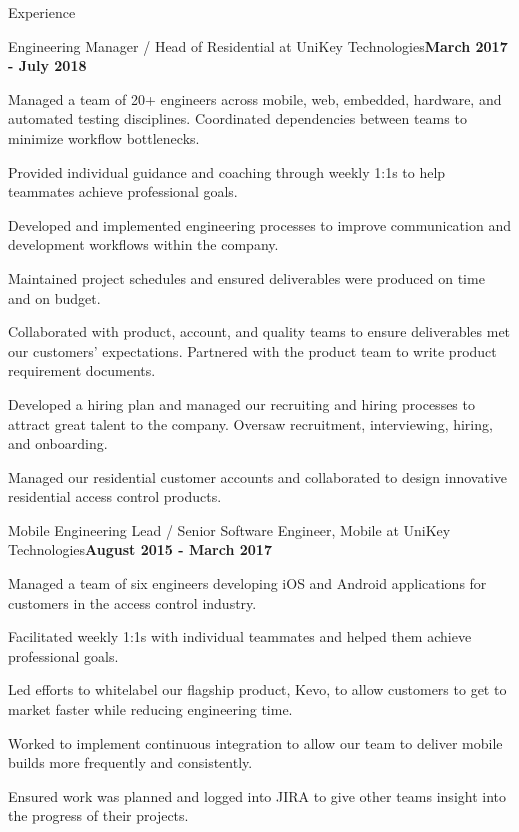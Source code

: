 \documentclass{resume} %
\begin{document}
\begin{rSection}{Experience}
\begin{rSubsection}{Engineering Manager / Head of Residential at UniKey Technologies}{\bf March 2017 - July 2018}{}{}
    \item Managed a team of 20+ engineers across mobile, web, embedded, hardware, and automated testing disciplines. Coordinated dependencies between teams to minimize workflow bottlenecks.
    \item Provided individual guidance and coaching through weekly 1:1s to help teammates achieve professional goals.
    \item Developed and implemented engineering processes to improve communication and development workflows within the company.
    \item Maintained project schedules and ensured deliverables were produced on time and on budget.
    \item Collaborated with product, account, and quality teams to ensure deliverables met our customers' expectations. Partnered with the product team to write product requirement documents.
    \item Developed a hiring plan and managed our recruiting and hiring processes to attract great talent to the company. Oversaw recruitment, interviewing, hiring, and onboarding.
    \item Managed our residential customer accounts and collaborated to design innovative residential access control products.

    \end{rSubsection}


    \begin{rSubsection}{Mobile Engineering Lead / Senior Software Engineer, Mobile at UniKey Technologies}{\bf August 2015 - March 2017}{}{}

    \item Managed a team of six engineers developing iOS and Android applications for customers in the access control industry. 
    \item Facilitated weekly 1:1s with individual teammates and helped them achieve professional goals.
    \item Led efforts to whitelabel our flagship product, Kevo, to allow customers to get to market faster while reducing engineering time.
    \item Worked to implement continuous integration to allow our team to deliver mobile builds more frequently and consistently.
    \item Ensured work was planned and logged into JIRA to give other teams insight into the progress of their projects.


\end{rSubsection}
\end{rSection}
\end{document}
